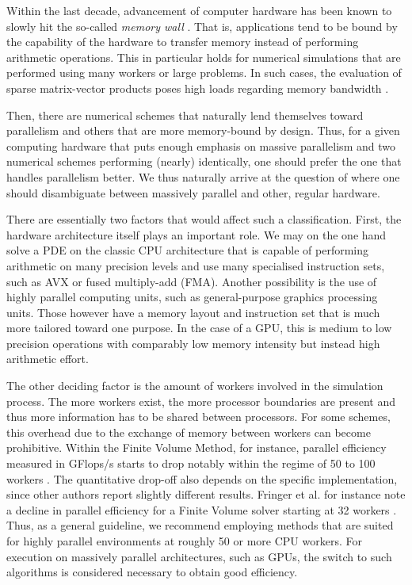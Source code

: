 \documentclass[asi,article,submit,moreauthors]{Definitions/mdpi}
\begin{document}
Within the last decade, advancement of computer hardware has been known to slowly hit the so-called \textit{memory wall} \cite{mckeeMemoryWall2011}.
That is, applications tend to be bound by the capability of the hardware to transfer memory instead of performing arithmetic operations.
This in particular holds for numerical simulations that are performed using many workers or large problems.
In such cases, the evaluation of sparse matrix-vector products poses high loads regarding memory bandwidth \cite{arndtExaDGHighOrderDiscontinuous2020}.

Then, there are numerical schemes that naturally lend themselves toward parallelism and others that are more memory-bound by design.
Thus, for a given computing hardware that puts enough emphasis on massive parallelism and two numerical schemes performing (nearly) identically, one should prefer the one that handles parallelism better.
We thus naturally arrive at the question of where one should disambiguate between massively parallel and other, regular hardware.

There are essentially two factors that would affect such a classification.
First, the hardware architecture itself plays an important role.
We may on the one hand solve a PDE on the classic CPU architecture that is capable of performing arithmetic on many precision levels and use many specialised instruction sets, such as AVX or fused multiply-add (FMA).
Another possibility is the use of highly parallel computing units, such as general-purpose graphics processing units.
Those however have a memory layout and instruction set that is much more tailored toward one purpose.
In the case of a GPU, this is medium to low precision operations with comparably low memory intensity but instead high arithmetic effort.

The other deciding factor is the amount of workers involved in the simulation process.
The more workers exist, the more processor boundaries are present and thus more information has to be shared between processors.
For some schemes, this overhead due to the exchange of memory between workers can become prohibitive.
Within the Finite Volume Method, for instance, parallel efficiency measured in GFlops/s starts to drop notably within the regime of 50 to 100 workers \cite{marshallFinitevolumeIncompressibleNavier1997}.
The quantitative drop-off also depends on the specific implementation, since other authors report slightly different results. 
Fringer et al. for instance note a decline in parallel efficiency for a Finite Volume solver starting at 32 workers \cite{fringerUnstructuredgridFinitevolumeNonhydrostatic2006}.
Thus, as a general guideline, we recommend employing methods that are suited for highly parallel environments at roughly 50 or more CPU workers.
For execution on massively parallel architectures, such as GPUs, the switch to such algorithms is considered necessary to obtain good efficiency.
\end{document}
